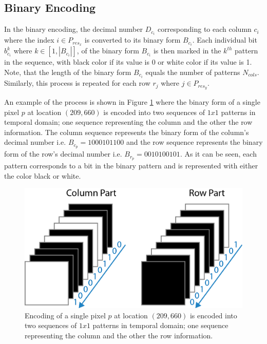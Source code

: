 \documentclass[final,12pt,3p]{elsarticle}
\begin{document}
\subsection{Binary Encoding}
In the binary encoding, the decimal number $D_{c_{i}}$ corresponding to each column $c_{i}$ where the index $i \in P_{res_{x}}$ is converted to its binary form $B_{c_{i}}$. Each individual bit $b_{c_{i}}^{k}$ where $k \in [1, |B_{c_{i}}|]$, of the binary form $B_{c_{i}}$ is then marked in the $k^{th}$ pattern in the sequence, with black color if its value is 0 or white color if its value is 1. Note, that the length of the binary form $B_{c_{i}}$ equals the number of patterns $N_{cols}$. Similarly, this process is repeated for each row $r_{j}$ where $j \in P_{res_{y}}$. 

An example of the process is shown in Figure \ref{fig:pixel_encoding} where the binary form of a single pixel $p$ at location $(209,660)$ is encoded into two sequences of $1x1$ patterns in temporal domain; one sequence representing the column and the other the row information. The column sequence represents the binary form of the column's decimal number i.e. $B_{c_{p}} = 1000101100$ and the row sequence represents the binary form of the row's decimal number i.e. $B_{r_{p}} = 0010100101$. As it can be seen, each pattern corresponds to a bit in the binary pattern and is represented with either the color black or white.

\begin{figure}[!ht]
 \centering
 \includegraphics[scale=0.8]{./images/pixelSeq.png}
 \caption{\label{fig:pixel_encoding} Encoding of a single pixel $p$ at location $(209,660)$ is encoded into two sequences of $1x1$ patterns in temporal domain; one sequence representing the column and the other the row information.}
\end{figure}
\end{document}
